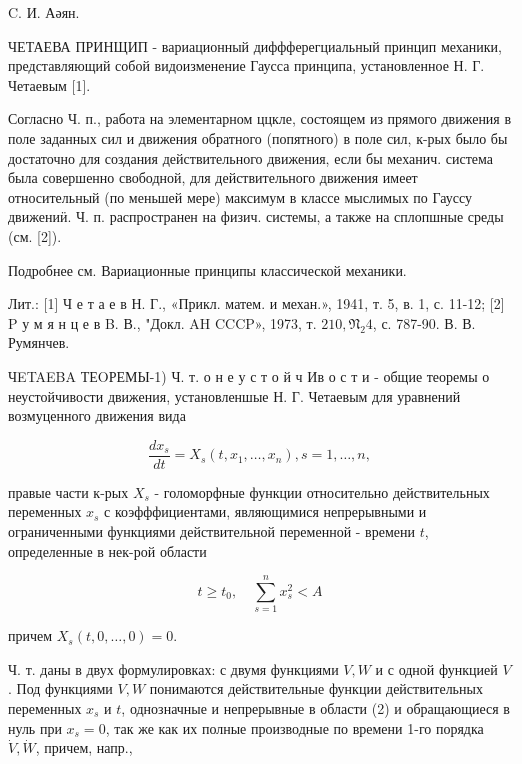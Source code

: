 \documentclass[10pt]{article}
\begin{document}
C. И. Аәян.



ЧЕТАЕВА ПРИНЩИП - вариационный диффферегциальный принцип механики, представляющий собой видоизменение Гаусса принципа, установленное Н. Г. Четаевым [1].



Согласно Ч. п., работа на элементарном ццкле, состоящем из прямого движения в поле заданных сил и движения обратного (попятного) в поле сил, к-рых было бы достаточно для создания действительного движения, если бы механич. система была совершенно свободной, для действительного движения имеет относительный (по меньшей мере) максимум в классе мыслимых по Гауссу движениӥ. Ч. п. распространен на физич. системы, а также на сплопшные среды (см. [2]).



Подробнее см. Вариационные принципы классической механики.



Лит.: [1] Ч е т а е в Н. Г., «Прикл. матем. и механ.», 1941, т. 5, в. 1, с. 11-12; [2] P у м я н ц е в B. В., "Докл. AH CCCP», 1973, т. $210, \mathfrak{N}_{2} 4$, с. 787-90. В. В. Румянчев.



ЧETAEBA ТЕOРЕМЫ-1) Ч. т. о н е у с т о й ч Ив о с т и - общие теоремы о неустойчивости движения, установленшые Н. Г. Четаевым для уравнений возмуценного движения вида



\[

\frac{d x_{s}}{d t}=X_{s}\left(t, x_{1}, \ldots, x_{n}\right), s=1, \ldots, n,

\]



правые части к-рых $X_{s}$ - голоморфные функции относительно действительных переменных $x_{s}$ с коэфффициентами, являющимися непрерывными и ограниченными функциями действительной переменной - времени $t$, определенные в нек-рой области



\[

t \geqslant t_{0}, \quad \sum_{s=1}^{n} x_{s}^{2}<A

\]



причем $X_{s}(t, 0, \ldots, 0)=0$.



Ч. т. даны в двух формулировках: с двумя функциями $V, W$ и с одной функцией $V$. Под функциями $V, W$ понимаются действительные функции действительных переменных $x_{s}$ и $t$, однозначные и непрерывные в области (2) и обращающиеся в нуль при $x_{s}=0$, так же как их полные производные по времени 1-го порядка $\dot{V}, \dot{W}$, причем, напр.,
\end{document}
